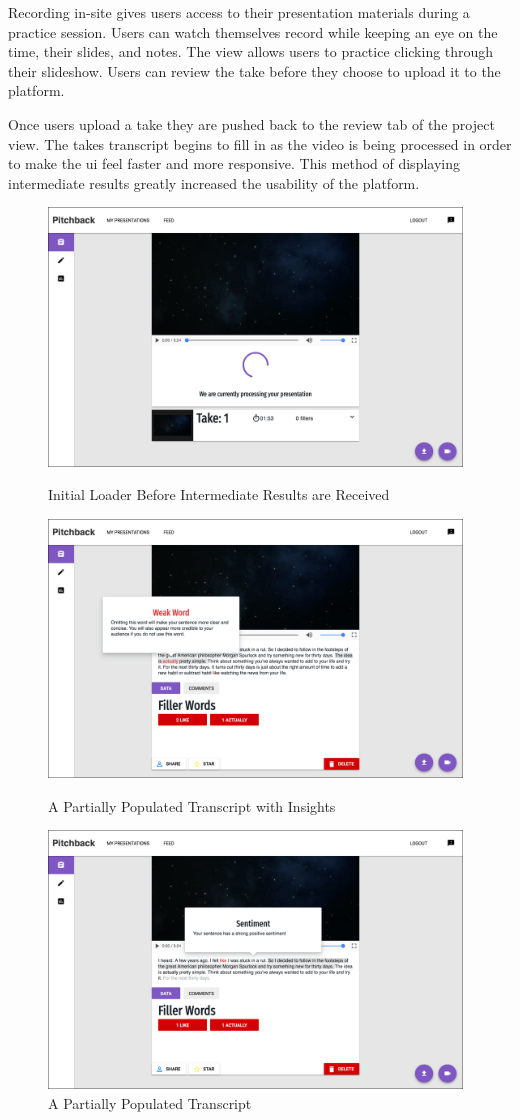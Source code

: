 Recording in-site gives users access to their presentation materials during a
practice session. Users can watch themselves record while keeping an eye on the
time, their slides, and notes. The view allows users to practice clicking
through their slideshow. Users can review the take before they choose to upload
it to the platform.

Once users upload a take they are pushed back to the review tab of the project
view. The takes transcript begins to fill in as the video is being processed in
order to make the ui feel faster and more responsive. This method of displaying
intermediate results greatly increased the usability of the platform.

\begin{figure}[H]
  \centering
   \includegraphics[height=2.7in]{figures/processing_1}
   \caption{Initial Loader Before Intermediate Results are Received}
   \includegraphics[height=2.7in]{figures/processing_3}
   \caption{A Partially Populated Transcript with Insights}
   \includegraphics[height=2.7in]{figures/processing_2}
   \caption{A Partially Populated Transcript}
\end{figure}

